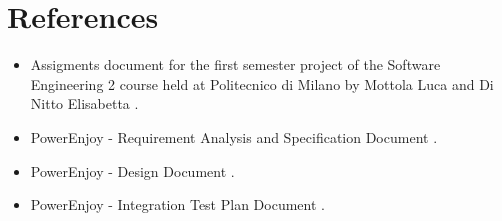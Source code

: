 \section{References}

\begin{itemize}
	\item Assigments document for the first semester project of the Software Engineering 2 course held at Politecnico di Milano by Mottola Luca and Di Nitto Elisabetta \cite{assignments}.
	\item PowerEnjoy - Requirement Analysis and Specification Document \cite{rasd}.
	\item PowerEnjoy - Design Document \cite{dd}.
	\item PowerEnjoy - Integration Test Plan Document \cite{itpd}.
\end{itemize}

